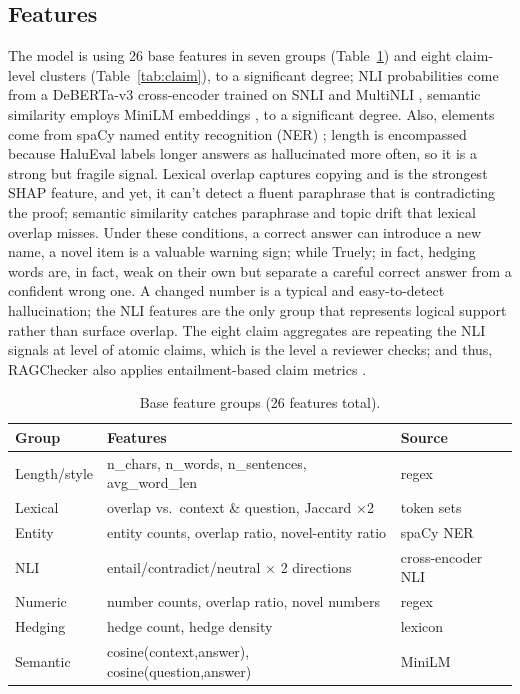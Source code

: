 \documentclass[a4paper,fleqn]{cas-sc}
\begin{document}
\subsection{Features}

The model is using 26 base features in seven groups (Table~\ref{tab:features}) and eight claim-level clusters (Table~\ref{tab:claim}), to a significant degree; NLI probabilities come from a DeBERTa-v3 cross-encoder \cite{deberta} trained on SNLI \cite{snli} and MultiNLI \cite{mnli}, semantic similarity employs MiniLM embeddings \cite{sbert,minilm}, to a significant degree. Also, elements come from spaCy named entity recognition (NER) \cite{spacy}; length is encompassed because HaluEval labels longer answers as hallucinated more often, so it is a strong but fragile signal. Lexical overlap captures copying and is the strongest SHAP feature, and yet, it can't detect a fluent paraphrase that is contradicting the proof; semantic similarity catches paraphrase and topic drift that lexical overlap misses. Under these conditions, a correct answer can introduce a new name, a novel item is a valuable warning sign; while Truely; in fact, hedging words are, in fact, weak on their own but separate a careful correct answer from a confident wrong one. A changed number is a typical and easy-to-detect hallucination; the NLI features are the only group that represents logical support rather than surface overlap. The eight claim aggregates are repeating the NLI signals at level of atomic claims, which is the level a reviewer checks; and thus, RAGChecker also applies entailment-based claim metrics \cite{ru2024ragchecker}.

\begin{table}[pos=htbp]
  \centering
  \caption{Base feature groups (26 features total).}
  \label{tab:features}
  \begin{tabular}{>{\raggedright\arraybackslash}p{2.1cm}>{\raggedright\arraybackslash}p{4.6cm}>{\raggedright\arraybackslash}p{4.4cm}}
    \toprule
    \textbf{Group} & \textbf{Features}                                   & \textbf{Source}   \\
    \midrule
    Length/style   & n\_chars, n\_words, n\_sentences, avg\_word\_len    & regex             \\
    Lexical        & overlap vs.\ context \& question, Jaccard $\times$2 & token sets        \\
    Entity         & entity counts, overlap ratio, novel-entity ratio    & spaCy NER         \\
    NLI            & entail/contradict/neutral $\times$ 2 directions     & cross-encoder NLI \\
    Numeric        & number counts, overlap ratio, novel numbers         & regex             \\
    Hedging        & hedge count, hedge density                          & lexicon           \\
    Semantic       & cosine(context,answer), cosine(question,answer)     & MiniLM            \\
    \bottomrule
  \end{tabular}
\end{table}
\end{document}
